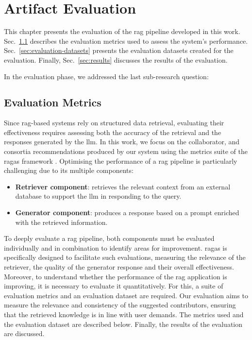 \chapter{Artifact Evaluation}\label{chap:evaluation}

This chapter presents the evaluation of the \gls{rag} pipeline developed in this work.
Sec.~\ref{sec:evaluation-metrics} describes the evaluation metrics used to assess the system's performance.
Sec.~\ref{sec:evaluation-datasets} presents the evaluation datasets created for the evaluation.
Finally, Sec.~\ref{sec:results} discusses the results of the evaluation.

In the evaluation phase, we addressed the last sub-research question:
\begin{center}
    \rqFour
\end{center}

\section{Evaluation Metrics}\label{sec:evaluation-metrics}
Since \gls{rag}-based systems rely on structured data retrieval, evaluating their effectiveness requires assessing both the accuracy of the retrieval and the responses generated by the \gls{llm}.
In this work, we focus on the collaborator, and consortia recommendations produced by our system using the metrics suite of the \gls{ragas} framework \cite{ragas2024}.
Optimising the performance of a \gls{rag} pipeline is particularly challenging due to its multiple components:

\begin{itemize}
    \item \textbf{Retriever component}: retrieves the relevant context from an external database to support the \gls{llm} in responding to the query.
    \item \textbf{Generator component}: produces a response based on a prompt enriched with the retrieved information.
\end{itemize}

To deeply evaluate a \gls{rag} pipeline, both components must be evaluated individually and in combination to identify areas for improvement.
\gls{ragas} is specifically designed to facilitate such evaluations, measuring the relevance of the retriever, the quality of the generator response and their overall effectiveness.
Moreover, to understand whether the performance of the \gls{rag} application is improving, it is necessary to evaluate it quantitatively.
For this, a suite of evaluation metrics and an evaluation dataset are required.
Our evaluation aims to measure the relevance and consistency of the suggested contributors, ensuring that the retrieved knowledge is in line with user demands.
The metrics used and the evaluation dataset are described below.
Finally, the results of the evaluation are discussed.


